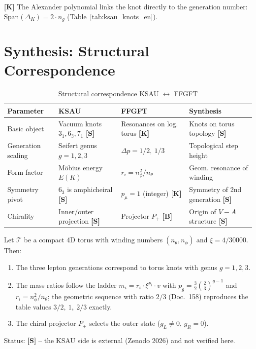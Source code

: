 \textbf{[K]} The Alexander polynomial links the knot directly to the
generation number: $\text{Span}(\Delta_K) = 2\cdot n_g$
(Table~\ref{tab:ksau_knots_en}).

\section{Synthesis: Structural Correspondence}

\begin{table}[h]
\centering
\caption{Structural correspondence KSAU $\leftrightarrow$ FFGFT}
\label{tab:synthesis_en}
\begin{tabular}{llll}
\toprule
Parameter & KSAU & FFGFT & Synthesis \\
\midrule
Basic object
  & Vacuum knots $3_1, 6_3, 7_1$ \textbf{[S]}
  & Resonances on log. torus \textbf{[K]}
  & Knots on torus topology \textbf{[S]} \\
Generation scaling
  & Seifert genus $g = 1,2,3$
  & $\Delta p = 1/2,\ 1/3$
  & Topological step height \\
Form factor
  & Möbius energy $E(K)$
  & $r_i = n_\phi^2/n_\theta$
  & Geom. resonance of winding \\
Symmetry pivot
  & $6_3$ is amphicheiral \textbf{[S]}
  & $p_\mu = 1$ (integer) \textbf{[K]}
  & Symmetry of 2nd generation \textbf{[S]} \\
Chirality
  & Inner/outer projection \textbf{[S]}
  & Projector $P_+$ \textbf{[B]}
  & Origin of $V{-}A$ structure \textbf{[S]} \\
\bottomrule
\end{tabular}
\end{table}

\begin{keyresult}
Let $\mathcal{T}$ be a compact 4D torus with winding numbers
$(n_\theta, n_\phi)$ and $\xi = 4/30000$. Then:
\begin{enumerate}
  \item The three lepton generations correspond to torus knots with
    genus $g = 1, 2, 3$.
  \item The mass ratios follow the ladder $m_i = r_i\cdot\xi^{p_i}
    \cdot v$ with $p_g = \frac{3}{2}\left(\frac{2}{3}\right)^{g-1}$
    and $r_i = n_\phi^2/n_\theta$; the geometric sequence with
    ratio $2/3$ (Doc.~158) reproduces the table values
    $3/2,\ 1,\ 2/3$ exactly.
  \item The chiral projector $P_+$ selects the outer state
    ($g_L \neq 0$, $g_R = 0$).
\end{enumerate}
Status: \textbf{[S]} -- the KSAU side is external (Zenodo 2026)
and not verified here.
\end{keyresult}

